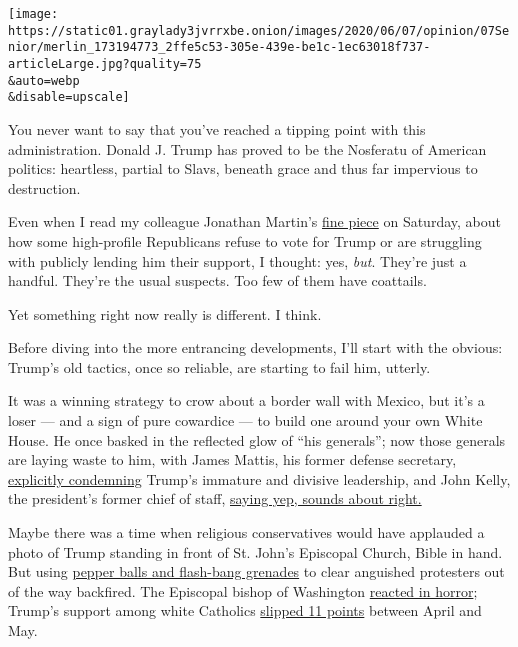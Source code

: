 \texttt{[image: https://static01.graylady3jvrrxbe.onion/images/2020/06/07/opinion/07Senior/merlin\_173194773\_2ffe5c53-305e-439e-be1c-1ec63018f737-articleLarge.jpg?quality=75\\\&auto=webp\\\&disable=upscale]}

You never want to say that you've reached a tipping point with this
administration. Donald J. Trump has proved to be the Nosferatu of
American politics: heartless, partial to Slavs, beneath grace and thus
far impervious to destruction.

Even when I read my colleague Jonathan Martin's
\href{https://www.nytimes3xbfgragh.onion/2020/06/06/us/politics/trump-biden-republicans-voters.html?action=click\&module=Top\%20Stories\&pgtype=Homepage}{fine
piece} on Saturday, about how some high-profile Republicans refuse to
vote for Trump or are struggling with publicly lending him their
support, I thought: yes, \emph{but}. They're just a handful. They're the
usual suspects. Too few of them have coattails.

Yet something right now really is different. I think.

Before diving into the more entrancing developments, I'll start with the
obvious: Trump's old tactics, once so reliable, are starting to fail
him, utterly.

It was a winning strategy to crow about a border wall with Mexico, but
it's a loser --- and a sign of pure cowardice --- to build one around
your own White House. He once basked in the reflected glow of ``his
generals''; now those generals are laying waste to him, with James
Mattis, his former defense secretary,
\href{https://www.theatlantic.com/politics/archive/2020/06/james-mattis-denounces-trump-protests-militarization/612640/}{explicitly
condemning} Trump's immature and divisive leadership, and John Kelly,
the president's former chief of staff,
\href{https://www.cbsnews.com/news/john-kelly-trump-military-force-agrees-with-mattis/}{saying
yep, sounds about right.}

Maybe there was a time when religious conservatives would have applauded
a photo of Trump standing in front of St. John's Episcopal Church, Bible
in hand. But using
\href{https://www.usatoday.com/in-depth/graphics/2020/06/05/george-floyd-protests-trump-church-photo-curfew-park/3127684001/}{pepper
balls and flash-bang grenades} to clear anguished protesters out of the
way backfired. The Episcopal bishop of Washington
\href{https://www.washingtonpost.com/religion/bishop-budde-trump-church/2020/06/01/20ca70f8-a466-11ea-b619-3f9133bbb482_story.html}{reacted
in horror}; Trump's support among white Catholics
\href{https://www.prri.org/research/trump-favorability-white-catholic-and-non-college-americans-national-unrest-protests/}{slipped
11 points} between April and May.

